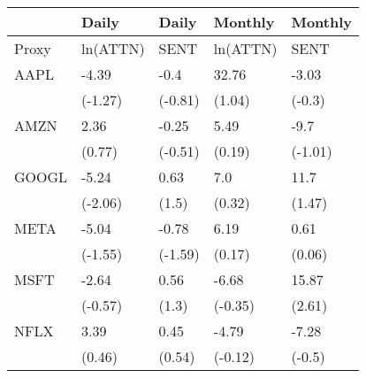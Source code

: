 \begin{tabular}{lllll}
\toprule
{} &     Daily &    Daily &   Monthly &  Monthly \\
\midrule
Proxy &  ln(ATTN) &     SENT &  ln(ATTN) &     SENT \\
AAPL  &     -4.39 &     -0.4 &     32.76 &    -3.03 \\
      &   (-1.27) &  (-0.81) &    (1.04) &   (-0.3) \\
AMZN  &      2.36 &    -0.25 &      5.49 &     -9.7 \\
      &    (0.77) &  (-0.51) &    (0.19) &  (-1.01) \\
GOOGL &     -5.24 &     0.63 &       7.0 &     11.7 \\
      &   (-2.06) &    (1.5) &    (0.32) &   (1.47) \\
META  &     -5.04 &    -0.78 &      6.19 &     0.61 \\
      &   (-1.55) &  (-1.59) &    (0.17) &   (0.06) \\
MSFT  &     -2.64 &     0.56 &     -6.68 &    15.87 \\
      &   (-0.57) &    (1.3) &   (-0.35) &   (2.61) \\
NFLX  &      3.39 &     0.45 &     -4.79 &    -7.28 \\
      &    (0.46) &   (0.54) &   (-0.12) &   (-0.5) \\
\bottomrule
\end{tabular}

